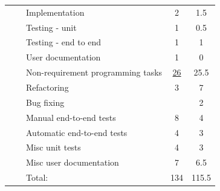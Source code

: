 \begin{table}[!htb]
\begin{tabularx}{\textwidth}{l l X c c}
	   &  & Implementation & 2 & 1.5 \\
	   &  & Testing - unit & 1 & 0.5 \\
	   &  & Testing - end to end & 1 & 1 \\
	   &  & User documentation & 1 & 0 \\
	\addlinespace
	14 &  & Non-requirement programming tasks & \underline{ 26 } & 25.5 \\
	   &  & Refactoring & 3 & 7 \\
	   &  & Bug fixing & & 2 \\
	   &  & Manual end-to-end tests & 8 & 4 \\
	   &  & Automatic end-to-end tests & 4 & 3 \\
	   &  & Misc unit tests & 4 & 3 \\
	   &  & Misc user documentation & 7 & 6.5 \\
	\midrule
	& & Total: & 134 & 115.5 \\
	\bottomrule
\end{tabularx}
\end{table}


